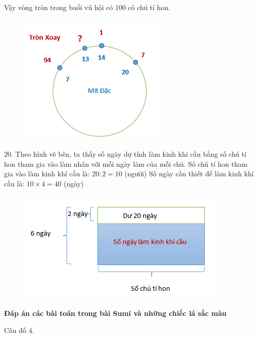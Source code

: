 \vskip 0.1cm
Vậy vòng tròn trong buổi vũ hội có $100$ cô chú tí hon.
\begin{figure}[H]
	\centering
	\vspace*{-5pt}
	\captionsetup{labelformat= empty, justification=centering}
	\includegraphics[width=0.5\linewidth]{15}
	\vspace*{-15pt}
\end{figure}
$20.$ Theo hình vẽ bên, ta thấy số ngày dự tính làm kinh khí cầu bằng số chú tí hon tham gia vào làm nhân với mỗi ngày làm của mỗi chú.
Số chú tí hon tham gia vào làm kinh khí cầu là: $20 : 2 = 10$ (người)
\vskip 0.1cm
Số ngày cần thiết để làm kinh khí cầu là: $10 \times 4 = 40$ (ngày)
\begin{figure}[H]
	\centering
	\vspace*{-5pt}
	\captionsetup{labelformat= empty, justification=centering}
	\includegraphics[width=0.85\linewidth]{16}
	\vspace*{-15pt}
\end{figure}
\newpage
\begin{center}
	{}
\end{center}
\begin{center}
	\textbf{\color{toancuabi}Đáp án các bài toán trong bài Sumi và những chiếc lá sắc màu}
\end{center}
Câu đố $4$. %

